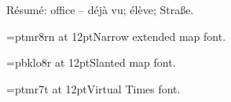 \documentclass{article}
\begin{document}
R\'esum\'e: office -- d\'ej\`a vu; \guillemotleft \'el\`eve\guillemotright; Stra\ss e.

{\font\narrow=ptmr8rn at 12pt\narrow Narrow extended map font.}

{\font\slanted=pbklo8r at 12pt\slanted Slanted map font.}

{\font\virtualtimes=ptmr7t at 12pt\virtualtimes Virtual Times font.}
\end{document}
